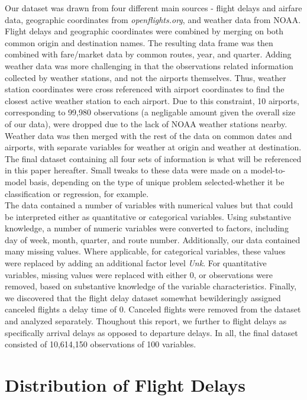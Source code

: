 \documentclass[12pt, a4paper, openany]{book}
\newcommand\tab[1][1cm]{\hspace*{#1}}
\begin{document}
	\tab Our dataset was drawn from four different main sources - flight delays and airfare data, geographic coordinates from \textit{openflights.org}, and weather data from NOAA. Flight delays and geographic coordinates were combined by merging on both common origin and destination names. The resulting data frame was then combined with fare/market data by common routes, year, and quarter. Adding weather data was more challenging in that the observations related information collected by weather stations, and not the airports themselves. Thus, weather station coordinates were cross referenced with airport coordinates to find the closest active weather station to each airport. Due to this constraint, 10 airports, corresponding to 99,980 observations (a negligable amount given the overall size of our data), were dropped due to the lack of NOAA weather stations nearby. Weather data was then merged with the rest of the data on common dates and airports, with separate variables for weather at origin and weather at destination. The final dataset containing all four sets of information is what will be referenced in this paper hereafter. Small tweaks to these data were made on a model-to-model basis, depending on the type of unique problem selected-whether it be classification or regression, for example. \\
	
	\tab The data contained a number of variables with numerical values but that could be interpreted either as quantitative or categorical variables. Using substantive knowledge, a number of numeric variables were converted to factors, including day of week, month, quarter, and route number. Additionally, our data contained many missing values. Where applicable, for categorical variables, these values were replaced by adding an additional factor level \textit{Unk}. For quantitative variables, missing values were replaced with either 0, or observations were removed, based on substantive knowledge of the variable characteristics. Finally, we discovered that the flight delay dataset somewhat bewilderingly assigned canceled flights a delay time of 0. Canceled flights were removed from the dataset and analyzed separately. Thoughout this report, we further to flight delays as specifically arrival delays as opposed to departure delays. In all, the final dataset consisted of 10,614,150 observations of 100 variables. 
	
	\section{Distribution of Flight Delays}
	
\end{document}
